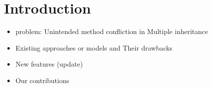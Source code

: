 \section{Introduction}

\begin{itemize}
	\item problem: Unintended method confliction in Multiple inheritance
	\item Existing approaches or models and Their drawbacks
	\item New features (update)
	\item Our contributions
\end{itemize}